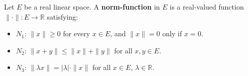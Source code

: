 Let $E$ be a real linear space. A \textbf{norm-function} in $E$ is a real-valued function $\|\cdot\| : E \to \mathbb{R}$ satisfying:

\begin{itemize}
\item $N_1$: $\|x\| \geq 0$ for every $x \in E$, and $\|x\| = 0$ only if $x = 0$.
\item $N_2$: $\|x + y\| \leq \|x\| + \|y\|$ for all $x, y \in E$.
\item $N_3$: $\|\lambda x\| = |\lambda| \cdot \|x\|$ for all $x \in E$, $\lambda \in \mathbb{R}$.
\end{itemize}
